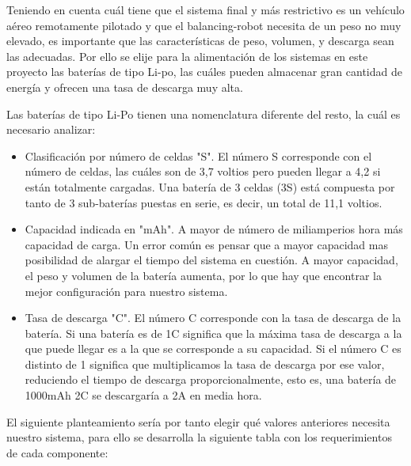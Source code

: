 Teniendo en cuenta cuál tiene que el sistema final y más restrictivo es un vehículo aéreo remotamente pilotado y que el balancing-robot necesita de un peso no muy elevado, es importante que las características de peso, volumen, y descarga sean las adecuadas. Por ello se elije para la alimentación de los sistemas en este proyecto las baterías de tipo Li-po, las cuáles pueden almacenar gran cantidad de energía y ofrecen una tasa de descarga muy alta. \newline

Las baterías de tipo Li-Po tienen una nomenclatura diferente del resto, la cuál es necesario analizar:

\begin{itemize}
	\item Clasificación por número de celdas "S". El número S corresponde con el número de celdas, las cuáles son de 3,7 voltios pero pueden llegar a 4,2 si están totalmente cargadas. Una batería de 3 celdas (3S) está compuesta por tanto de 3 sub-baterías puestas en serie, es decir, un total de 11,1 voltios.
	\item Capacidad indicada en "mAh". A mayor de número de miliamperios hora más capacidad de carga. Un error común es pensar que a mayor capacidad mas posibilidad de alargar el tiempo del sistema en cuestión. A mayor capacidad, el peso y volumen de la batería aumenta, por lo que hay que encontrar la mejor configuración para nuestro sistema. 
	\item Tasa de descarga "C". El número C corresponde con la tasa de descarga de la batería. Si una batería es de 1C significa que la máxima tasa de descarga a la que puede llegar es a la que se corresponde a su capacidad. Si el número C es distinto de 1 significa que multiplicamos la tasa de descarga por ese valor, reduciendo el tiempo de descarga proporcionalmente, esto es, una batería de 1000mAh 2C se descargaría a 2A en media hora.
\end{itemize}

El siguiente planteamiento sería por tanto elegir qué valores anteriores necesita nuestro sistema, para ello se desarrolla la siguiente tabla con los requerimientos de cada componente:

